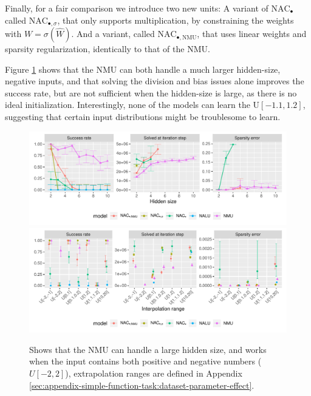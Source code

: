 Finally, for a fair comparison we introduce two new units: A variant of $\mathrm{NAC}_{\bullet}$ called $\mathrm{NAC}_{\bullet, \sigma}$, that only supports multiplication, by constraining the weights with $W = \sigma(\hat{W})$. And a variant, called $\mathrm{NAC}_{\bullet, \mathrm{NMU}}$, that uses linear weights and sparsity regularization, identically to that of the NMU.

Figure \ref{fig:simple-function-static-theoreical-claims-experiment} shows that the NMU can both handle a much larger hidden-size, negative inputs, and that solving the division and bias issues alone improves the success rate, but are not sufficient when the hidden-size is large, as there is no ideal initialization. Interestingly, none of the models can learn the $\mathrm{U}[-1.1,1.2]$, suggesting that certain input distributions might be troublesome to learn.

\begin{figure}[h]
\centering
\includegraphics[width=\linewidth,trim={0 1.3cm 0 0},clip]{results/simple_function_static_mul_hidden_size_short.pdf}
\includegraphics[width=\linewidth,trim={0 0.5cm 0 0.775cm},clip]{results/simple_function_static_mul_range.pdf}
\caption{Shows that the NMU can handle a large hidden size, and works when the input contains both positive and negative numbers ($U[-2,2]$),  extrapolation ranges are defined in Appendix \ref{sec:appendix-simple-function-task:dataset-parameter-effect}.} 
\label{fig:simple-function-static-theoreical-claims-experiment}
\end{figure}

